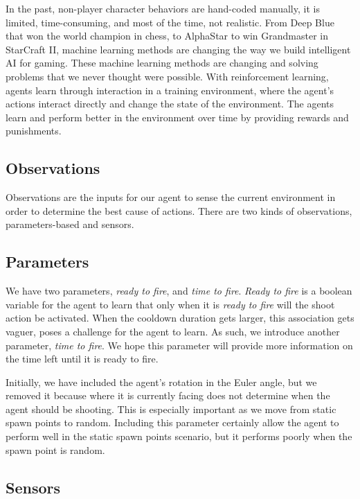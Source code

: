 \documentclass[conference]{IEEEtran}
\begin{document}
In the past, non-player character behaviors are hand-coded manually, it is limited, time-consuming, and most of the time, not realistic. From Deep Blue that won the world champion in chess, to AlphaStar to win Grandmaster in StarCraft II, machine learning methods are changing the way we build intelligent AI for gaming. These machine learning methods are changing and solving problems that we never thought were possible. With reinforcement learning, agents learn through interaction in a training environment, where the agent's actions interact directly and change the state of the environment. The agents learn and perform better in the environment over time by providing rewards and punishments.

\subsection{Observations}

Observations are the inputs for our agent to sense the current environment in order to determine the best cause of actions. There are two kinds of observations, parameters-based and sensors.

\subsection{Parameters}

We have two parameters, \textit{ready to fire}, and \textit{time to fire}. \textit{Ready to fire} is a boolean variable for the agent to learn that only when it is \textit{ready to fire} will the shoot action be activated. When the cooldown duration gets larger, this association gets vaguer, poses a challenge for the agent to learn. As such, we introduce another parameter, \textit{time to fire}. We hope this parameter will provide more information on the time left until it is ready to fire.

Initially, we have included the agent's rotation in the Euler angle, but we removed it because where it is currently facing does not determine when the agent should be shooting. This is especially important as we move from static spawn points to random. Including this parameter certainly allow the agent to perform well in the static spawn points scenario, but it performs poorly when the spawn point is random. 

\subsection{Sensors}
\end{document}
